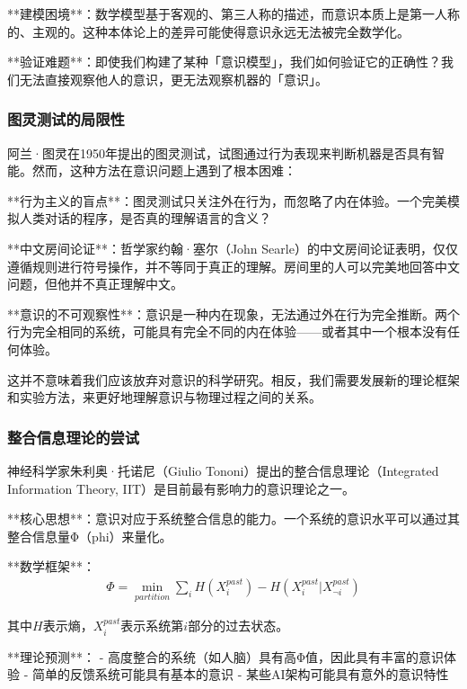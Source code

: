 **建模困境**：数学模型基于客观的、第三人称的描述，而意识本质上是第一人称的、主观的。这种本体论上的差异可能使得意识永远无法被完全数学化。

**验证难题**：即使我们构建了某种「意识模型」，我们如何验证它的正确性？我们无法直接观察他人的意识，更无法观察机器的「意识」。

\subsubsection{图灵测试的局限性}

阿兰·图灵在1950年提出的图灵测试，试图通过行为表现来判断机器是否具有智能。然而，这种方法在意识问题上遇到了根本困难：

**行为主义的盲点**：图灵测试只关注外在行为，而忽略了内在体验。一个完美模拟人类对话的程序，是否真的理解语言的含义？

**中文房间论证**：哲学家约翰·塞尔（John Searle）的中文房间论证表明，仅仅遵循规则进行符号操作，并不等同于真正的理解。房间里的人可以完美地回答中文问题，但他并不真正理解中文。

**意识的不可观察性**：意识是一种内在现象，无法通过外在行为完全推断。两个行为完全相同的系统，可能具有完全不同的内在体验——或者其中一个根本没有任何体验。

\begin{center}
这并不意味着我们应该放弃对意识的科学研究。相反，我们需要发展新的理论框架和实验方法，来更好地理解意识与物理过程之间的关系。
\end{center}

\subsubsection{整合信息理论的尝试}

神经科学家朱利奥·托诺尼（Giulio Tononi）提出的整合信息理论（Integrated Information Theory, IIT）是目前最有影响力的意识理论之一。

**核心思想**：意识对应于系统整合信息的能力。一个系统的意识水平可以通过其整合信息量Φ（phi）来量化。

**数学框架**：
\begin{align}
\Phi = \min_{partition} \sum_{i} H(X_i^{past}) - H(X_i^{past}|X_{\neg i}^{past})
\end{align}

其中$H$表示熵，$X_i^{past}$表示系统第$i$部分的过去状态。

**理论预测**：
- 高度整合的系统（如人脑）具有高Φ值，因此具有丰富的意识体验
- 简单的反馈系统可能具有基本的意识
- 某些AI架构可能具有意外的意识特性

